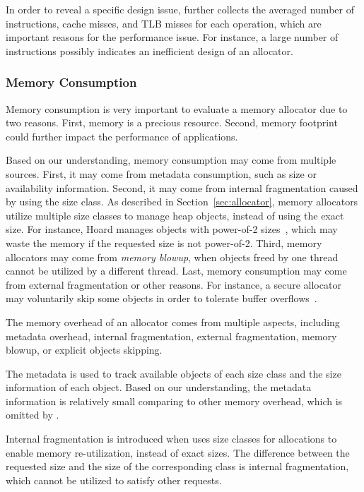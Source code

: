 In order to reveal a specific design issue, \MP{} further collects the averaged number of instructions, cache misses, and TLB misses for each operation, which are important reasons for the performance issue. For instance, a large number of instructions possibly indicates an inefficient design of an allocator. 

\subsubsection{Memory Consumption}
\label{sec:memoryconsumption}

Memory consumption is very important to evaluate a memory allocator due to two reasons. First, memory is a precious resource. Second, memory footprint could further impact the performance of applications. 

Based on our understanding, memory consumption may come from multiple sources. First, it may come from metadata consumption, such as size or availability information. 
Second, it may come from internal fragmentation caused by using the size class. As described in Section~\ref{sec:allocator}, memory allocators utilize multiple size classes to manage heap objects, instead of using the exact size. For instance, Hoard manages objects with power-of-2 sizes~\citep{Hoard}, which may waste the memory if the requested size is not power-of-2. Third, memory allocators may come from \textit{memory blowup}, when objects freed by one thread cannot be utilized by a different thread. %
Last, memory consumption may come from external fragmentation or other reasons. For instance, a secure allocator may voluntarily skip some objects in order to tolerate buffer overflows~\citep{DieHard}. 

The memory overhead of an allocator comes from multiple aspects, including metadata overhead, internal fragmentation, external fragmentation, memory blowup, or explicit objects skipping. 

The metadata is used to track available objects of each size class and the size information of each object. Based on our understanding, the metadata information is relatively small comparing to other memory overhead, which is omitted by \MP{}. 

Internal fragmentation is introduced when \MP{} uses size classes for allocations to enable memory re-utilization, instead of exact sizes. The difference between the requested size and the size of the corresponding class is internal fragmentation, which cannot be utilized to satisfy other requests. 


